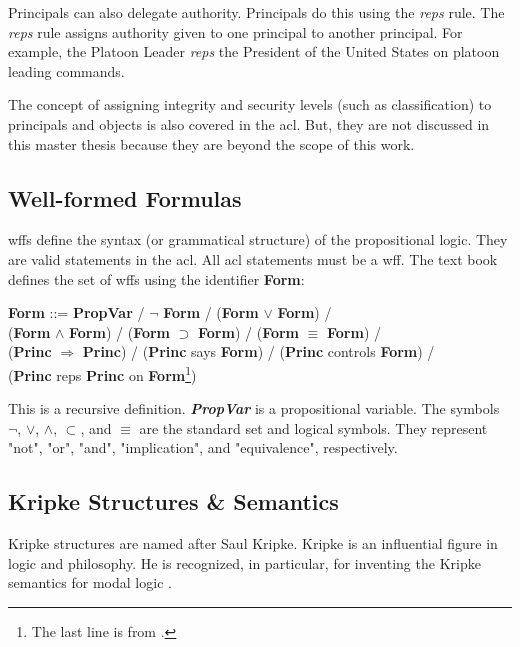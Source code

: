 \documentclass[../../main/main.tex]{subfiles}
\begin{document}
Principals can also delegate authority.  Principals do this using the \textit{reps} rule.  The \textit{reps} rule assigns authority given to one principal to another principal.  For example, the Platoon Leader \textit{reps} the President of the United States on platoon leading commands.

The concept of assigning integrity and security levels (such as classification) to principals and objects is also covered in the \gls{acl}.  But, they are not discussed in this master thesis because they are beyond the scope of this work.

\subsection{Well-formed Formulas}\label{ssec:wff}
\Glspl{wff} define the syntax (or grammatical structure) of the propositional logic.  They are valid statements in the \gls{acl}.  All \gls{acl} statements must be a \gls{wff}.  The text book defines the set of \gls{wff}s using the identifier \textbf{Form}:

\begin{center}\label{wffdef}
\textbf{Form} ::= \textbf{PropVar} / $\neg$ \textbf{Form} / (\textbf{Form} $\vee$ \textbf{Form}) / \\ 
	                  (\textbf{Form} $\wedge$ \textbf{Form}) / (\textbf{Form} $\supset$ \textbf{Form}) / (\textbf{Form} $\equiv$ \textbf{Form}) / \\
	                  (\textbf{Princ} $\Rightarrow$ \textbf{Princ}) / (\textbf{Princ} says \textbf{Form}) / (\textbf{Princ} controls \textbf{Form}) /\\
	                  (\textbf{Princ} reps \textbf{Princ} on \textbf{Form}\footnote{The last line is from \cite{certmanual}.})
\end{center}

This is a recursive definition.  \textbf{\textit{PropVar}} is a propositional variable.  The symbols $\neg$, $\vee$, $\wedge$, $\subset$, and $\equiv$ are the standard set and logical symbols.  They represent "not", "or", "and", "implication", and "equivalence", respectively.  

\subsection{Kripke Structures \& Semantics}\label{ssec:kripke}
Kripke structures are named after Saul Kripke.  Kripke is an influential figure in logic and philosophy.  He is recognized, in particular, for inventing the Kripke semantics for modal logic \cite{saulk}.    
\end{document}
